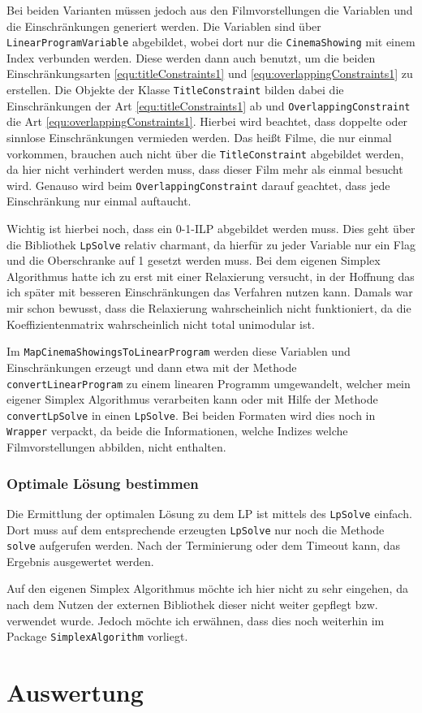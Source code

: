 \documentclass[a4paper, 12pt]{article}
\begin{document}
Bei beiden Varianten müssen jedoch aus den Filmvorstellungen die Variablen und die Einschränkungen generiert werden.
Die Variablen sind über \texttt{LinearProgramVariable} abgebildet, wobei dort nur die \texttt{CinemaShowing} mit einem Index verbunden werden.
Diese werden dann auch benutzt, um die beiden Einschränkungsarten \eqref{equ:titleConstraints1} und \eqref{equ:overlappingConstraints1} zu erstellen.
Die Objekte der Klasse \texttt{TitleConstraint} bilden dabei die Einschränkungen der Art \eqref{equ:titleConstraints1} ab und \texttt{OverlappingConstraint} die Art \eqref{equ:overlappingConstraints1}.
Hierbei wird beachtet, dass doppelte oder sinnlose Einschränkungen vermieden werden.
Das heißt Filme, die nur einmal vorkommen, brauchen auch nicht über die \texttt{TitleConstraint} abgebildet werden, da hier nicht verhindert werden muss, dass dieser Film mehr als einmal besucht wird.
Genauso wird beim \texttt{OverlappingConstraint} darauf geachtet, dass jede Einschränkung nur einmal auftaucht.

Wichtig ist hierbei noch, dass ein 0-1-ILP abgebildet werden muss.
Dies geht über die Bibliothek \texttt{LpSolve} relativ charmant, da hierfür zu jeder Variable nur ein Flag und die Oberschranke auf 1 gesetzt werden muss.
Bei dem eigenen Simplex Algorithmus hatte ich zu erst mit einer Relaxierung versucht, in der Hoffnung das ich später mit besseren Einschränkungen das Verfahren nutzen kann.
Damals war mir schon bewusst, dass die Relaxierung wahrscheinlich nicht funktioniert, da die Koeffizientenmatrix wahrscheinlich nicht total unimodular ist.  

Im \texttt{MapCinemaShowingsToLinearProgram} werden diese Variablen und Einschränkungen erzeugt und dann etwa mit der Methode \linebreak \texttt{convertLinearProgram} zu einem linearen Programm umgewandelt, welcher mein eigener Simplex Algorithmus verarbeiten kann oder mit Hilfe der Methode \texttt{convertLpSolve} in einen \texttt{LpSolve}.
Bei beiden Formaten wird dies noch in \texttt{Wrapper} verpackt, da beide die Informationen, welche Indizes welche Filmvorstellungen abbilden, nicht enthalten.

\subsubsection{Optimale Lösung bestimmen}

Die Ermittlung der optimalen Lösung zu dem LP ist mittels des \texttt{LpSolve} einfach.
Dort muss auf dem entsprechende erzeugten \texttt{LpSolve} nur noch die Methode \texttt{solve} aufgerufen werden.
Nach der Terminierung oder dem Timeout kann, das Ergebnis ausgewertet werden.

Auf den eigenen Simplex Algorithmus möchte ich hier nicht zu sehr eingehen, da nach dem Nutzen der externen Bibliothek dieser nicht weiter gepflegt bzw. verwendet wurde.
Jedoch möchte ich erwähnen, dass dies noch weiterhin im Package \texttt{SimplexAlgorithm} vorliegt.

\section{Auswertung}
\end{document}
